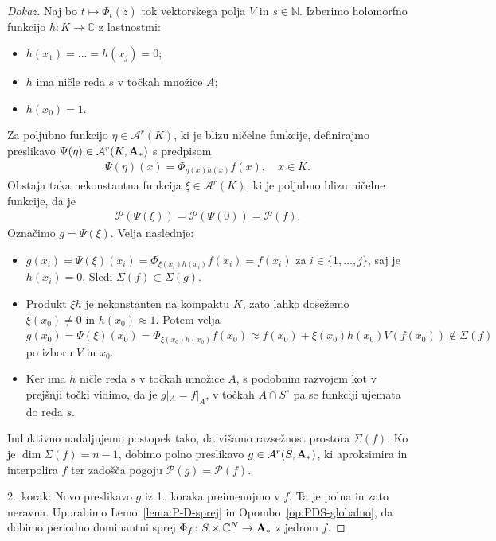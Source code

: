 \documentclass[12pt,a4paper,twoside]{article}
\theoremstyle{definition} %
\newenvironment{dokaz}[1][Dokaz]{\begin{proof}[#1]}{\end{proof}}
\theoremstyle{plain} %
\numberwithin{equation}{section}  %
\begin{document}
\begin{dokaz}
Naj bo $t \mapsto \Phi_{t}(z)$ tok vektorskega polja $V$ in $s \in \mathbb{N}$. 
Izberimo holomorfno funkcijo $h \colon K \to \mathbb{C}$ z lastnostmi:
\begin{itemize}
\item $h(x_{1}) = \dots = h(x_{j}) = 0$;
\item $h$ ima ničle reda $s$ v točkah množice $A$;
\item $h(x_0) = 1$.
\end{itemize}
Za poljubno funkcijo $\eta \in \mathcal{A}^{r}(K)$, ki je blizu ničelne funkcije, definirajmo preslikavo $\Psi (\eta) \in \mathcal{A}^{r}(K, \textbf{\textup{A}}_{*})$ s predpisom
\begin{gather}
\Psi (\eta)(x) = \Phi _{\eta(x) h(x)} f(x), \quad x \in K.
\end{gather}
Obstaja taka nekonstantna funkcija $\xi \in \mathcal{A}^{r}(K)$, ki je poljubno blizu ničelne funkcije, da je
\begin{gather*}
\mathcal{P}(\Psi (\xi)) = \mathcal{P}(\Psi(0)) = \mathcal{P}(f).
\end{gather*}
Označimo $g = \Psi(\xi)$. Velja naslednje:
\begin{itemize}
\item $g(x_{i}) = \Psi(\xi)(x_{i}) = \Phi_{\xi(x_{i}) h(x_{i})} f(x_{i}) = f(x_{i})$ za $i \in \{1, \dots , j \}$, saj je $h(x_{i})=0$. Sledi 
	$\Sigma(f) \subset \Sigma(g)$.
\item Produkt $\xi h$ je nekonstanten na kompaktu $K$, zato lahko dosežemo $\xi (x_0) \neq 0$ in $h(x_0) \approx 1.$ Potem velja
	$g(x_0) = \Psi(\xi)(x_0) = \Phi_{\xi(x_0) h(x_0)} f(x_0) \approx f(x_0) + \xi(x_0) h(x_0) V(f(x_0)) \notin \Sigma(f)$ po izboru $V$ in $x_0$.
\item Ker ima $h$ ničle reda $s$ v točkah množice $A$, s podobnim razvojem kot v prejšnji točki vidimo, da je $g|_{A} = f|_{A}$, v točkah $A \cap S^{\circ}$ pa se funkciji ujemata do reda $s$.
\end{itemize}
Induktivno nadaljujemo postopek tako, da višamo razsežnost prostora $\Sigma(f)$. Ko je $\dim \Sigma(f) = n-1$, dobimo polno preslikavo $g \in \mathcal{A}^{r}(S, \textbf{\textup{A}}_{*})$, ki aproksimira in interpolira $f$ ter zadošča pogoju $\mathcal{P}(g) = \mathcal{P}(f)$. \newline

2.~korak: Novo preslikavo $g$ iz 1.~koraka preimenujmo v $f$. Ta je polna in zato neravna.
Uporabimo Lemo~\ref{lema:P-D-sprej} in Opombo~\ref{op:PDS-globalno}, da dobimo periodno dominantni sprej $\Phi_{f} \colon S \times \mathbb{C}^{N} \to \textbf{\textup{A}}_{*}$ z jedrom $f$.


\end{dokaz}
\end{document}
